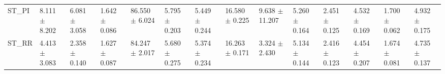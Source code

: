 \begin{tabular}{llllllllllllll}
ST_PI     &   8.111 $ \pm $ 8.202 &  6.081 $ \pm $ 3.058 &  1.642 $ \pm $ 0.086 &   86.550 $ \pm $ 6.024 &   5.795 $ \pm $ 0.203 &   5.449 $ \pm $ 0.244 &  16.580 $ \pm $ 0.225 &  9.638 $ \pm $ 11.207 &  5.260 $ \pm $ 0.164 &  2.451 $ \pm $ 0.125 &   4.532 $ \pm $ 0.169 &  1.700 $ \pm $ 0.062 &   4.932 $ \pm $ 0.175 \\
ST_RR     &   4.413 $ \pm $ 3.083 &  2.358 $ \pm $ 0.140 &  1.627 $ \pm $ 0.087 &   84.247 $ \pm $ 2.017 &   5.680 $ \pm $ 0.275 &   5.374 $ \pm $ 0.234 &  16.263 $ \pm $ 0.171 &   3.324 $ \pm $ 2.430 &  5.134 $ \pm $ 0.144 &  2.416 $ \pm $ 0.123 &   4.454 $ \pm $ 0.207 &  1.674 $ \pm $ 0.081 &   4.735 $ \pm $ 0.137 \\
\bottomrule
\end{tabular}
